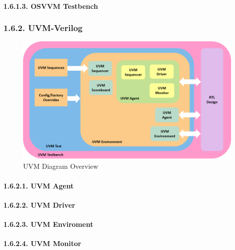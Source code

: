 \documentclass[
]{article}
\begin{document}
\hypertarget{osvvm-testbench-1}{%
\paragraph{1.6.1.3. OSVVM Testbench}\label{osvvm-testbench-1}}

\hypertarget{uvm-verilog-1}{%
\subsubsection{1.6.2. UVM-Verilog}\label{uvm-verilog-1}}

\begin{figure}
\centering
\includegraphics{../bench/uvm-testbench.png}
\caption{UVM Diagram Overview}
\end{figure}

\hypertarget{uvm-agent-1}{%
\paragraph{1.6.2.1. UVM Agent}\label{uvm-agent-1}}

\hypertarget{uvm-driver-1}{%
\paragraph{1.6.2.2. UVM Driver}\label{uvm-driver-1}}

\hypertarget{uvm-enviroment-1}{%
\paragraph{1.6.2.3. UVM Enviroment}\label{uvm-enviroment-1}}

\hypertarget{uvm-monitor-1}{%
\paragraph{1.6.2.4. UVM Monitor}\label{uvm-monitor-1}}
\end{document}
